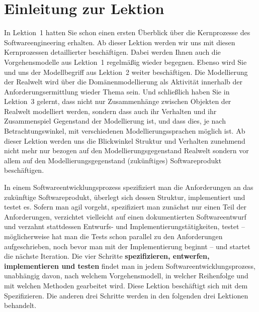 \cleardoublepage
\chapter*{Einleitung zur Lektion}

In  Lektion~1 %
hatten Sie schon einen ersten Überblick über die Kernprozesse des Softwareengineering erhalten. Ab dieser Lektion werden wir uns mit diesen Kernprozessen detaillierter beschäftigen. Dabei werden Ihnen auch die Vorgehensmodelle aus Lektion~1 %
regelmäßig wieder begegnen. Ebenso wird Sie und uns der Modell\-begriff aus Lektion~2 %
weiter beschäftigen. Die Modellierung der Realwelt wird über die Domänenmodellierung als Aktivität innerhalb der Anforderungsermittlung wieder Thema sein. Und schließlich haben Sie in Lektion~3 gelernt, dass nicht nur Zusammenhänge zwischen Objekten der Realwelt modelliert werden, sondern dass auch ihr Verhalten und ihr Zusammenspiel Gegenstand der Modellierung ist, und dass dies, je nach Betrachtungswinkel, mit verschiedenen Modellierungssprachen möglich ist. Ab dieser Lektion werden uns die Blickwinkel Struktur und Verhalten zunehmend nicht mehr nur bezogen auf den Modellierungsgegenstand Realwelt sondern vor allem auf den Modellierungsgegenstand (zukünftiges) Softwareprodukt beschäftigen.

In  einem Softwareentwicklungsprozess spezifiziert man die Anforderungen an das zukünftige Softwareprodukt, überlegt sich dessen Struktur, implementiert und testet es. Sofern man agil vorgeht, spezifiziert man zunächst nur einen Teil der Anforderungen, verzichtet vielleicht auf einen dokumentierten Softwareentwurf und verzahnt stattdessen Entwurfs- und Implementierungstätigkeiten, testet -- möglicherweise hat man die Tests schon pa\-ra\-llel zu den Anforderungen aufgeschrieben, noch bevor man mit der Implementierung beginnt -- und startet die nächste Iteration. Die vier \mbox{Schritte} \textbf{spezifizieren, entwerfen, implementieren und testen} findet man in jedem Softwareentwicklungsprozess, unabhängig davon, nach welchem Vorgehensmodell, in welcher Reihenfolge und mit welchen Methoden gearbeitet wird. Diese Lektion beschäftigt sich mit dem Spezifizieren. Die anderen drei Schritte werden in den folgenden drei Lektionen behandelt.

